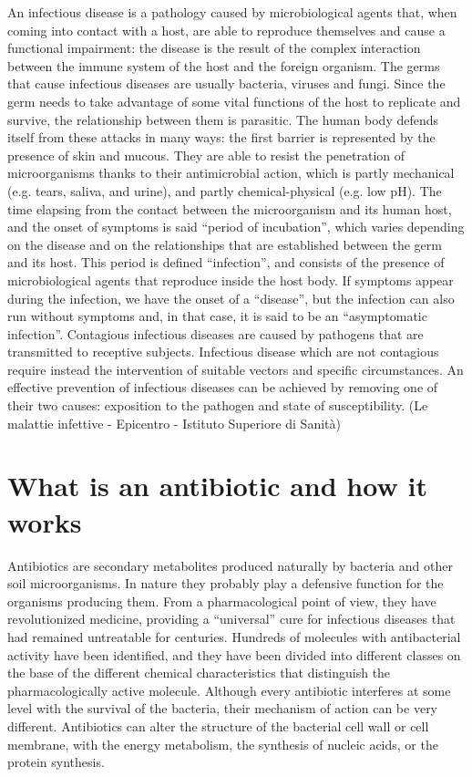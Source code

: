 \documentclass[11pt]{report}
\begin{document}
An infectious disease is a pathology caused by microbiological agents that, when coming into contact with a host, are able to reproduce themselves and cause a functional impairment: the disease is the result of the complex interaction between the immune system of the host and the foreign organism. The germs that cause infectious diseases are usually bacteria, viruses and fungi. Since the germ needs to take advantage of some vital functions of the host to replicate and survive, the relationship between them is parasitic.
The human body defends itself from these attacks in many ways: the first barrier is represented by the presence of skin and mucous. They are able to resist the penetration of microorganisms thanks to their antimicrobial action, which is partly mechanical (e.g. tears, saliva, and urine), and partly chemical-physical (e.g. low pH). The time elapsing from the contact between the microorganism and its human host, and the onset of symptoms is said “period of incubation”, which varies depending on the disease and on the relationships that are established between the germ and its host. This period is defined “infection”, and consists of the presence of microbiological agents that reproduce inside the host body.
If symptoms appear during the infection, we have the onset of a “disease”, but the infection can also run without symptoms and, in that case, it is said to be an “asymptomatic infection”.
Contagious infectious diseases are caused by pathogens that are transmitted to receptive subjects. Infectious disease which are not contagious require instead the intervention of suitable vectors and specific circumstances. An effective prevention of infectious diseases can be achieved by removing one of their two causes: exposition to the pathogen and state of susceptibility.
(Le malattie infettive - Epicentro - Istituto Superiore di Sanità)

\chapter{What is an antibiotic and how it works}
Antibiotics are secondary metabolites produced naturally by bacteria and other soil microorganisms. In nature they probably play a defensive function for the organisms producing them. From a pharmacological point of view, they have revolutionized medicine, providing a “universal” cure for infectious diseases that had remained untreatable for centuries. Hundreds of molecules with antibacterial activity have been identified, and they have been divided into different classes on the base of the different chemical characteristics that distinguish the pharmacologically active molecule. Although every antibiotic interferes at some level with the survival of the bacteria, their mechanism of action can be very different. Antibiotics can alter the structure of the bacterial cell wall or cell membrane, with the energy metabolism, the synthesis of nucleic acids, or the protein synthesis.
\end{document}
